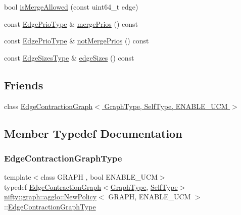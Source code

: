 \begin{DoxyCompactItemize}
\item 
bool \hyperlink{classnifty_1_1graph_1_1agglo_1_1NewPolicy_a135e5c2612afce2172cc4a3ac47a66cc}{is\+Merge\+Allowed} (const uint64\+\_\+t edge)
\item 
const \hyperlink{classnifty_1_1graph_1_1agglo_1_1NewPolicy_a19a7b9c67786f9dbf1dfb3c92aef141c}{Edge\+Prio\+Type} \& \hyperlink{classnifty_1_1graph_1_1agglo_1_1NewPolicy_a93c53212f83b7427a3dd53d02fd06e4e}{merge\+Prios} () const
\item 
const \hyperlink{classnifty_1_1graph_1_1agglo_1_1NewPolicy_a19a7b9c67786f9dbf1dfb3c92aef141c}{Edge\+Prio\+Type} \& \hyperlink{classnifty_1_1graph_1_1agglo_1_1NewPolicy_a63f56b84f75d674ababb3ae5266e1c75}{not\+Merge\+Prios} () const
\item 
const \hyperlink{classnifty_1_1graph_1_1agglo_1_1NewPolicy_ae2cee465b05f3ba70c44b2769e8bc750}{Edge\+Sizes\+Type} \& \hyperlink{classnifty_1_1graph_1_1agglo_1_1NewPolicy_acf3ea1c58fa6f0da63eba6c8d1ecb3ff}{edge\+Sizes} () const
\end{DoxyCompactItemize}
\subsection*{Friends}
\begin{DoxyCompactItemize}
\item 
class \hyperlink{classnifty_1_1graph_1_1agglo_1_1NewPolicy_a6939aa4c6113ba9c44fd5e048687ba92}{Edge\+Contraction\+Graph$<$ Graph\+Type, Self\+Type, E\+N\+A\+B\+L\+E\+\_\+\+U\+C\+M $>$}
\end{DoxyCompactItemize}


\subsection{Member Typedef Documentation}
\mbox{\label{classnifty_1_1graph_1_1agglo_1_1NewPolicy_a704192e6cafc4bfba6071564ea52e17c}} 
\subsubsection{\texorpdfstring{Edge\+Contraction\+Graph\+Type}{EdgeContractionGraphType}}
{\footnotesize\ttfamily template$<$class G\+R\+A\+PH , bool E\+N\+A\+B\+L\+E\+\_\+\+U\+CM$>$ \\
typedef \hyperlink{classnifty_1_1graph_1_1EdgeContractionGraph}{Edge\+Contraction\+Graph}$<$\hyperlink{classnifty_1_1graph_1_1agglo_1_1NewPolicy_ac8758b09604128d2bded40975109e808}{Graph\+Type}, \hyperlink{classnifty_1_1graph_1_1agglo_1_1NewPolicy}{Self\+Type}$>$ \hyperlink{classnifty_1_1graph_1_1agglo_1_1NewPolicy}{nifty\+::graph\+::agglo\+::\+New\+Policy}$<$ G\+R\+A\+PH, E\+N\+A\+B\+L\+E\+\_\+\+U\+CM $>$\+::\hyperlink{classnifty_1_1graph_1_1agglo_1_1NewPolicy_a704192e6cafc4bfba6071564ea52e17c}{Edge\+Contraction\+Graph\+Type}}

